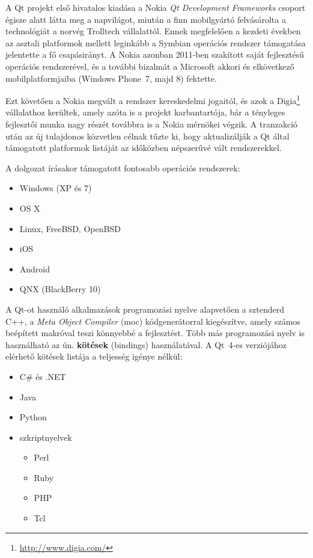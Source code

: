 \bigskip

A Qt projekt első hivatalos kiadása a Nokia \emph{Qt Development Frameworks} csoport égisze alatt látta meg a napvilágot, miután a finn mobilgyártó felvásárolta a technológiát a norvég Trolltech vállalattól. Ennek megfelelően a kezdeti években az asztali platformok mellett leginkább a Symbian operációs rendszer támogatása jelentette a fő csapásirányt. A Nokia azonban 2011-ben szakított saját fejlesztésű operációs rendszerével, és a további bizalmát a Microsoft akkori és elkövetkező mobilplatformjaiba (Windows Phone~7, majd 8) fektette.

Ezt követően a Nokia megvált a rendszer kereskedelmi jogaitól, és azok a Digia\footnote{\url{http://www.digia.com/}} vállalathoz kerültek, amely azóta is a projekt karbantartója, bár a tényleges fejlesztői munka nagy részét továbbra is a Nokia mérnökei végzik. A tranzakció után az új tulajdonos közvetlen célnak tűzte ki, hogy aktualizálják a Qt által támogatott platformok listáját az időközben népszerűvé vált rendszerekkel.

A dolgozat írásakor támogatott fontosabb operációs rendszerek:

\begin{itemize}
  \item Windows (XP és 7)
  \item OS X
  \item Linux, FreeBSD, OpenBSD
  \item iOS
  \item Android
  \item QNX (BlackBerry 10)
\end{itemize}

A Qt-ot használó alkalmazások programozási nyelve alapvetően a sztenderd C++, a \emph{Meta Object Compiler} (moc) kódgenerátorral kiegészítve, amely számos beépített makróval teszi könnyebbé a fejlesztést. Több más programozási nyelv is használható az ún. \textbf{kötések} (bindings) használatával. A Qt~4-es verziójához elérhető kötések listája a teljesség igénye nélkül:

\begin{itemize}
  \item C\# és .NET
  \item Java
  \item Python
  \item szkriptnyelvek
  \begin{itemize}
    \item Perl
    \item Ruby
    \item PHP
    \item Tcl
  \end{itemize}    
   
\end{itemize}

